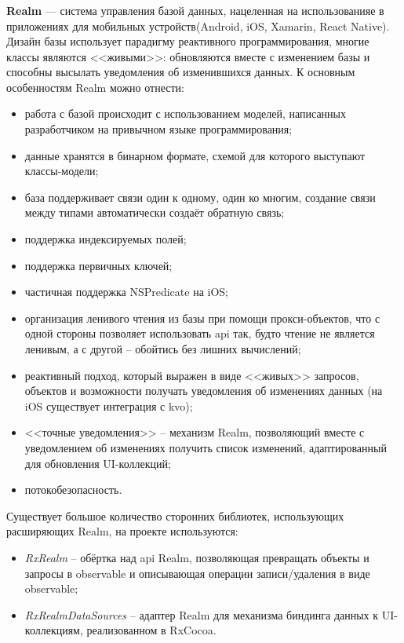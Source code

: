\subsubsection{}
\label{sec:development:arch:ios:realm}

\textbf{Realm} --- система управления базой данных, нацеленная на использованияе в приложениях для мобильных устройств(Android, iOS, Xamarin, React Native). Дизайн базы использует парадигму реактивного программирования, многие классы являются <<живыми>>: обновляются вместе с изменением базы и способны высылать уведомления об изменившихся данных. К основным особенностям Realm можно отнести:

\begin{itemize}
	\item работа с базой происходит с использованием моделей, написанных разработчиком на привычном языке программирования;
	\item данные хранятся в бинарном формате, схемой для которого выступают классы-модели;
	\item база поддерживает связи один к одному, один ко многим, создание связи между типами автоматически создаёт обратную связь;
	\item поддержка индексируемых полей;
	\item поддержка первичных ключей;
	\item частичная поддержка NSPredicate на iOS;
	\item организация ленивого чтения из базы при помощи прокси-объектов, что с одной стороны позволяет использовать \gls{api} так, будто чтение не является ленивым, а с другой -- обойтись без лишних вычислений;
	\item реактивный подход, который выражен в виде <<живых>> запросов, объектов и возможности получать уведомления об изменениях данных (на iOS существует интеграция с \gls{kvo});
	\item <<точные уведомления>> -- механизм Realm, позволяющий вместе с уведомлением об изменениях получить список изменений, адаптированный для обновления UI-коллекций;
	\item потокобезопасность.
\end{itemize}

Существует большое количество сторонних библиотек, использующих расширяющих Realm, на проекте используются:

\begin{itemize}
	\item \emph{RxRealm} -- обёртка над \gls{api} Realm, позволяющая превращать объекты и запросы в \gls{observable} и описывающая операции записи/удаления в виде \gls{observable};
	\item \emph{RxRealmDataSources} -- адаптер Realm для механизма биндинга данных к UI-коллекциям, реализованном в RxCocoa.
\end{itemize}